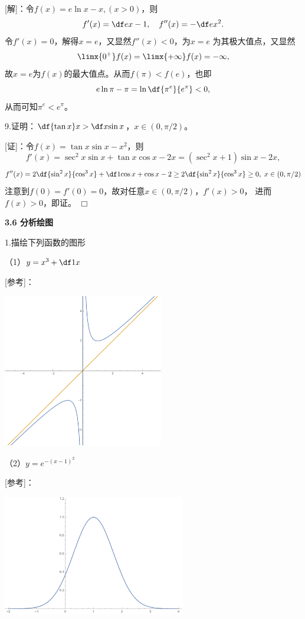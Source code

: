 [解]：令$f(x)=e\ln x-x,(x>0)$，则
$$f'(x)=\df ex-1,\quad f''(x)=-\df e{x^2}.$$
令$f'(x)=0$，解得$x=e$，又显然$f''(x)<0$，为$x=e$
为其极大值点，又显然
$$\limx{0^+}f(x)=\limx{+\infty}f(x)=-\infty,$$
故$x=e$为$f(x)$的最大值点。从而$f(\pi)<f(e)$，也即
$$e\ln\pi-\pi=\ln\df{\pi^e}{e^{\pi}}
<0,$$
从而可知$\pi^e<e^{\pi}$。\fin

\bigskip

9.证明：$\df{\tan x}x>\df x{\sin x}$，$x\in(0,\pi/2)$。

[证]：令$f(x)=\tan x\sin x-x^2$，则
$$f'(x)=\sec^2x\sin x+\tan x\cos x-2x=(\sec^2x+1)\sin x-2x,$$
$$f''(x)
=2\df{\sin^2x}{\cos^3x}+\df1{\cos x}+\cos x-2
\geq 2\df{\sin^2x}{\cos^3x}\geq 0,\;x\in(0,\pi/2)$$
注意到$f(0)=f'(0)=0$，故对任意$x\in(0,\pi/2)$，$f'(x)>0$，
进而$f(x)>0$，即证。
\hfill$\Box$

\begin{center}
	\bf 3.6 分析绘图
\end{center}

\bigskip

1.描绘下列函数的图形

（1）$y=x^3+\df1x$

[参考]：
\begin{center}
	\includegraphics[width=7cm]{./images/ch3/x1x.pdf}
\end{center}

（2）$y=e^{-(x-1)^2}$

[参考]：
\begin{center}
	\includegraphics[width=8cm]{./images/ch3/e-2x.pdf}
\end{center}

